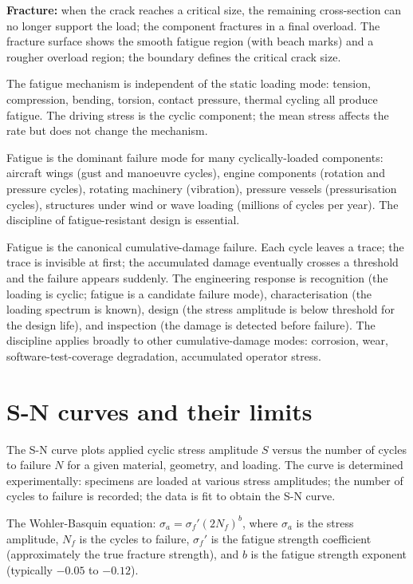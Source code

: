 \textbf{Fracture:} when the crack reaches a critical size, the remaining cross-section can no longer support the load; the component fractures in a final overload. The fracture surface shows the smooth fatigue region (with beach marks) and a rougher overload region; the boundary defines the critical crack size.

The fatigue mechanism is independent of the static loading mode: tension, compression, bending, torsion, contact pressure, thermal cycling all produce fatigue. The driving stress is the cyclic component; the mean stress affects the rate but does not change the mechanism.

Fatigue is the dominant failure mode for many cyclically-loaded components: aircraft wings (gust and manoeuvre cycles), engine components (rotation and pressure cycles), rotating machinery (vibration), pressure vessels (pressurisation cycles), structures under wind or wave loading (millions of cycles per year). The discipline of fatigue-resistant design is essential.

\begin{archetype}
Fatigue is the canonical cumulative-damage failure. Each cycle leaves a trace; the trace is invisible at first; the accumulated damage eventually crosses a threshold and the failure appears suddenly. The engineering response is recognition (the loading is cyclic; fatigue is a candidate failure mode), characterisation (the loading spectrum is known), design (the stress amplitude is below threshold for the design life), and inspection (the damage is detected before failure). The discipline applies broadly to other cumulative-damage modes: corrosion, wear, software-test-coverage degradation, accumulated operator stress.
\end{archetype}

\section{S-N curves and their limits}

The S-N curve plots applied cyclic stress amplitude $S$ versus the number of cycles to failure $N$ for a given material, geometry, and loading. The curve is determined experimentally: specimens are loaded at various stress amplitudes; the number of cycles to failure is recorded; the data is fit to obtain the S-N curve.

The Wohler-Basquin equation: $\sigma_a = \sigma_f' (2N_f)^b$, where $\sigma_a$ is the stress amplitude, $N_f$ is the cycles to failure, $\sigma_f'$ is the fatigue strength coefficient (approximately the true fracture strength), and $b$ is the fatigue strength exponent (typically $-0.05$ to $-0.12$).

